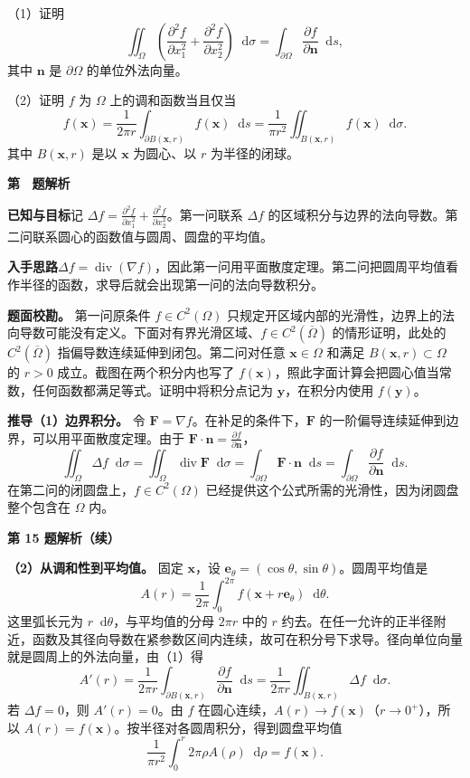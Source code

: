\documentclass[UTF8,zihao=-4,fontset=fandol]{ctexart}
\newcommand{\dd}{\mathop{}\!\mathrm{d}}
\newcommand{\Solution}{%
  \clearpage
  \fontsize{12}{18}\selectfont
  {\large\bfseries 第 \CurrentNumber\ 题解析}\par\smallskip
}
\newcommand{\Known}{\par\textbf{已知与目标}\quad}
\newcommand{\Method}{\par\textbf{入手思路}\quad}
\newcommand{\Derive}{\par\textbf{推导}\quad}
\begin{document}
（1）证明
\[
\iint_\Omega\left(\frac{\partial^2f}{\partial x_1^2}
+\frac{\partial^2f}{\partial x_2^2}\right)\dd\sigma
=\int_{\partial\Omega}\frac{\partial f}{\partial\mathbf n}\dd s,
\]
其中 $\mathbf n$ 是 $\partial\Omega$ 的单位外法向量。

（2）证明 $f$ 为 $\Omega$ 上的调和函数当且仅当
\[
f(\mathbf x)=\frac{1}{2\pi r}\int_{\partial B(\mathbf x,r)}f(\mathbf x)\dd s
=\frac{1}{\pi r^2}\iint_{B(\mathbf x,r)}f(\mathbf x)\dd\sigma.
\]
其中 $B(\mathbf x,r)$ 是以 $\mathbf x$ 为圆心、以 $r$ 为半径的闭球。

\Solution
\Known 记 $\Delta f=\frac{\partial^2 f}{\partial x_1^2}+\frac{\partial^2 f}{\partial x_2^2}$。第一问联系 $\Delta f$ 的区域积分与边界的法向导数。第二问联系圆心的函数值与圆周、圆盘的平均值。
\Method $\Delta f=\operatorname{div}(\nabla f)$，因此第一问用平面散度定理。第二问把圆周平均值看作半径的函数，求导后就会出现第一问的法向导数积分。

\textbf{题面校勘。} 第一问原条件 $f\in C^2(\Omega)$ 只规定开区域内部的光滑性，边界上的法向导数可能没有定义。下面对有界光滑区域、$f\in C^2(\overline\Omega)$ 的情形证明，此处的 $C^2(\overline\Omega)$ 指偏导数连续延伸到闭包。第二问对任意 $\mathbf x\in\Omega$ 和满足 $B(\mathbf x,r)\subset\Omega$ 的 $r>0$ 成立。截图在两个积分内也写了 $f(\mathbf x)$，照此字面计算会把圆心值当常数，任何函数都满足等式。证明中将积分点记为 $\mathbf y$，在积分内使用 $f(\mathbf y)$。
\Derive \textbf{（1）边界积分。} 令 $\mathbf F=\nabla f$。在补足的条件下，$\mathbf F$ 的一阶偏导连续延伸到边界，可以用平面散度定理。由于 $\mathbf F\cdot\mathbf n=\frac{\partial f}{\partial\mathbf n}$，
\[
\iint_\Omega\Delta f\dd\sigma
=\iint_\Omega\operatorname{div}\mathbf F\dd\sigma
=\int_{\partial\Omega}\mathbf F\cdot\mathbf n\dd s
=\int_{\partial\Omega}\frac{\partial f}{\partial\mathbf n}\dd s.
\]
在第二问的闭圆盘上，$f\in C^2(\Omega)$ 已经提供这个公式所需的光滑性，因为闭圆盘整个包含在 $\Omega$ 内。

\clearpage
{\large\bfseries 第 15 题解析（续）}\par\smallskip
\textbf{（2）从调和性到平均值。} 固定 $\mathbf x$，设 $\mathbf e_\theta=(\cos\theta,\sin\theta)$。圆周平均值是
\[
A(r)=\frac{1}{2\pi}\int_0^{2\pi} f(\mathbf x+r\mathbf e_\theta)\dd\theta.
\]
这里弧长元为 $r\dd\theta$，与平均值的分母 $2\pi r$ 中的 $r$ 约去。在任一允许的正半径附近，函数及其径向导数在紧参数区间内连续，故可在积分号下求导。径向单位向量就是圆周上的外法向量，由（1）得
\[
A'(r)=\frac{1}{2\pi r}\int_{\partial B(\mathbf x,r)}\frac{\partial f}{\partial\mathbf n}\dd s
=\frac{1}{2\pi r}\iint_{B(\mathbf x,r)}\Delta f\dd\sigma.
\]
若 $\Delta f=0$，则 $A'(r)=0$。由 $f$ 在圆心连续，$A(r)\to f(\mathbf x)$（$r\to0^+$），所以 $A(r)=f(\mathbf x)$。按半径对各圆周积分，得到圆盘平均值
\[
\frac{1}{\pi r^2}\int_0^r 2\pi\rho A(\rho)\dd\rho=f(\mathbf x).
\]
\end{document}
